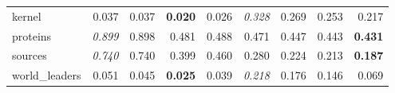 \documentclass[10pt,a4paper]{standalone}
\begin{document}
\begin{tabular}{|l||r|r|r|r|r|r|r|r|}
         kernel &        0.037 &        0.037 & \textbf{0.020} & 0.026 & \emph{0.328} & 0.269 & 0.253 &          0.217 \\
       proteins & \emph{0.899} &        0.898 &          0.481 & 0.488 &        0.471 & 0.447 & 0.443 & \textbf{0.431} \\
        sources & \emph{0.740} &        0.740 &          0.399 & 0.460 &        0.280 & 0.224 & 0.213 & \textbf{0.187} \\
 world\_leaders &        0.051 &        0.045 & \textbf{0.025} & 0.039 & \emph{0.218} & 0.176 & 0.146 &          0.069 \\
 \hline
\end{tabular}
\end{document}
